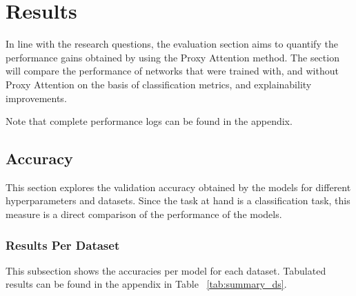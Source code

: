 \chapter{Results} \label{ch:results}
In line with the research questions, the evaluation section aims to quantify the performance gains obtained by using the Proxy Attention method. The section will compare the performance of networks that were trained with, and without Proxy Attention on the basis of classification metrics, and explainability improvements.

Note that complete performance logs can be found in the appendix.
\section{Accuracy}
This section explores the validation accuracy obtained by the models for different hyperparameters and datasets. Since the task at hand is a classification task, this measure is a direct comparison of the performance of the models.

\subsection{Results Per Dataset}
This subsection shows the accuracies per model for each dataset. Tabulated results can be found in the appendix in Table ~\ref{tab:summary_ds}.


